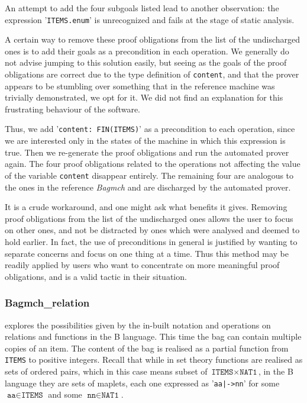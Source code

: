 \documentclass[12pt,journal,duplex]{IEEEtran}
\begin{document}
	An attempt to add the four subgoals listed lead to another observation: the expression '\texttt{ITEMS.enum}' is unrecognized and fails at the stage of static analysis.

	A certain way to remove these proof obligations from the list of the undischarged ones is to add their goals as a precondition in each operation. We generally do not advise jumping to this solution easily, but seeing as the goals of the proof obligations are correct due to the type definition of \texttt{content}, and that the prover appears to be stumbling over something that in the reference machine was trivially demonstrated, we opt for it. We did not find an explanation for this frustrating behaviour of the software.

	Thus, we add '\texttt{content: FIN(ITEMS)}' as a precondition to each operation, since we are interested only in the states of the machine in which this expression is true. Then we re-generate the proof obligations and run the automated prover again. The four proof obligations related to the operations not affecting the value of the variable \texttt{content} disappear entirely. The remaining four are analogous to the ones in the reference \emph{Bagmch} and are discharged by the automated prover.

	It is a crude workaround, and one might ask what benefits it gives. Removing proof obligations from the list of the undischarged ones allows the user to focus on other ones, and not be distracted by ones which were analysed and deemed to hold earlier. In fact, the use of preconditions in general is justified by wanting to separate concerns and focus on one thing at a time. Thus this method may be readily applied by users who want to concentrate on more meaningful proof obligations, and is a valid tactic in their situation.

	\subsubsection{Bagmch\_relation} explores the possibilities given by the in-built notation and operations on relations and functions in the B language. This time the bag can contain multiple copies of an item. The content of the bag is realised as a partial function from \texttt{ITEMS} to positive integers. Recall that while in set theory functions are realised as sets of ordered pairs, which in this case means subset of $\texttt{ITEMS} \times \texttt{NAT1}$, in the B language they are sets of maplets, each one expressed as '\texttt{aa|->nn}' for some $\texttt{aa} \in \texttt{ITEMS}$ and some $\texttt{nn} \in \texttt{NAT1}$.
\end{document}
